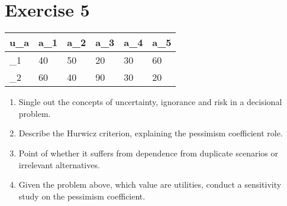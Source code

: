 \documentclass[\main/main.tex]{subfiles}
\begin{document}
\section{Exercise 5}

\begin{table}
  \begin{tabular}{L|LLLLL}
    u_{\w a} & a_1 & a_2 & a_3 & a_4 & a_5 \\
    \hline
    \w_1     & 40  & 50  & 20  & 30  & 60  \\
    \w_2     & 60  & 40  & 90  & 30  & 20
  \end{tabular}
\end{table}

\begin{enumerate}
  \item Single out the concepts of uncertainty, ignorance and risk in a decisional problem.
  \item Describe the Hurwicz criterion, explaining the pessimism coefficient role.
  \item Point of whether it suffers from dependence from duplicate scenarios or irrelevant alternatives.
  \item Given the problem above, which value are utilities,  conduct a sensitivity study on the pessimism coefficient.
\end{enumerate}
\end{document}
